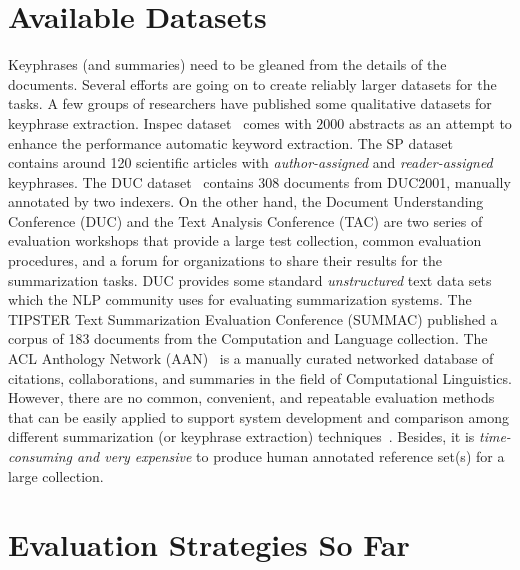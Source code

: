 \documentclass[a4paper]{report}
\begin{document}
\section{Available Datasets}
\par Keyphrases (and summaries) need to be gleaned from the details of the documents. Several efforts are going on to create reliably larger datasets for the tasks. A few groups of researchers have published some qualitative datasets for keyphrase extraction. Inspec dataset~\cite{Hulth:2003:IAK:1119355.1119383} comes with $2000$ abstracts as an attempt to enhance the performance automatic keyword extraction. The SP dataset~\cite{Nguyen:2007} contains around 120 scientific articles with \emph{author-assigned} and \emph{reader-assigned} keyphrases. The DUC dataset~\cite{conf/aaai/WanX08} contains 308 documents from DUC2001, manually annotated by two indexers. On the other hand, the Document Understanding Conference (DUC) and the Text Analysis Conference (TAC) are two series of evaluation workshops that provide a large test collection, common evaluation procedures, and a forum for organizations to share their results for the summarization tasks. DUC provides some standard \emph{unstructured} text data sets which the NLP community uses for evaluating summarization systems. The TIPSTER Text Summarization Evaluation Conference (SUMMAC) published a corpus of 183 documents from the Computation and Language collection.  The ACL Anthology Network (AAN)~\cite{aan:anthology} is a manually curated networked database of citations, collaborations, and summaries in the field of Computational Linguistics. However, there are no common, convenient, and repeatable evaluation methods that can be easily applied to support system development and comparison among different summarization (or keyphrase extraction) techniques~\cite{Lin:2003:AES:1073445.1073465}. Besides, it is \emph{time-consuming and very expensive} to produce human annotated reference set(s) for a large collection.


\section{Evaluation Strategies So Far}
\end{document}
